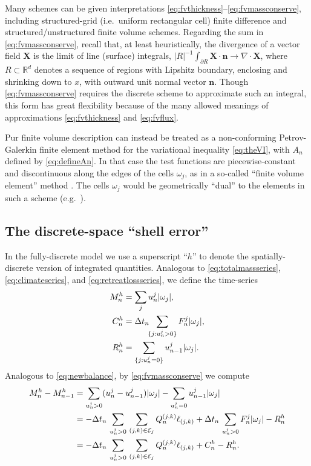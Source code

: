 \documentclass[final,onefignum]{siamart190516}
\newcommand\bn{\mathbf{n}}
\newcommand\bX{\mathbf{X}}
\newcommand{\Div}{\nabla\cdot}
\newcommand\RR{\mathbb{R}}
\begin{document}
Many schemes can be given interpretations \eqref{eq:fvthickness}--\eqref{eq:fvmassconserve}, including structured-grid (i.e.~uniform rectangular cell) finite difference \cite{Bueler2016,MortonMayers2005} and structured/unstructured finite volume \cite{LeVeque2002} schemes.  Regarding the sum in \eqref{eq:fvmassconserve}, recall that, at least heuristically, the divergence of a vector field $\bX$ is the limit of line (surface) integrals, $|R|^{-1} \int_{\partial R} \bX\cdot \bn \to \Div \bX$, where $R\subset \RR^d$ denotes a sequence of regions with Lipshitz boundary, enclosing and shrinking down to $x$, with outward unit normal vector $\bn$.  Though \eqref{eq:fvmassconserve} requires the discrete scheme to approximate such an integral, this form has great flexibility because of the many allowed meanings of approximations \eqref{eq:fvthickness} and \eqref{eq:fvflux}.

Pur finite volume description can instead be treated as a non-conforming Petrov-Galerkin finite element method for the variational inequality \eqref{eq:theVI}, with $A_n$ defined by \eqref{eq:defineAn}.  In that case the test functions are piecewise-constant and discontinuous along the edges of the cells $\omega_j$, as in a so-called ``finite volume element'' method \cite{Bueler2016,Cai1990,EwingLinLin2002}.  The cells $\omega_j$ would be geometrically ``dual'' to the elements in such a scheme (e.g.~\cite{Ringleretal2013}).

\subsection{The discrete-space ``shell error''}  \label{subsec:shellerror}  In the fully-discrete model we use a superscript ``$h$'' to denote the spatially-discrete version of integrated quantities.  Analogous to \eqref{eq:totalmassseries}, \eqref{eq:climateseries}, and \eqref{eq:retreatlossseries}, we define the time-series
\begin{align}
M_n^h &= \sum_j u_n^j |\omega_j|, \label{eq:fvtimeseriesdefn} \\
C_n^h &= \Delta t_n\!\!\sum_{\{j:u_n^j>0\}} F_n^j |\omega_j|,  \notag \\
R_n^h &= \sum_{\{j:u_n^j=0\}} u_{n-1}^j |\omega_j|.  \notag
\end{align}
Analogous to \eqref{eq:newbalance}, by \eqref{eq:fvmassconserve} we compute
\begin{align}
M_n^h - M_{n-1}^h &= \sum_{u_n^j>0} (u_n^j - u_{n-1}^j) |\omega_j| - \sum_{u_n^j=0} u_{n-1}^j |\omega_j| \notag \\
   &= - \Delta t_n\,\sum_{u_n^j>0}\, \sum_{(j,k)\in\mathcal{E}_j} Q_n^{(j,k)} \ell_{(j,k)} + \Delta t_n\,\sum_{u_n^j>0} F_n^j |\omega_j| - R_n^h \notag \\
   &= - \Delta t_n\,\sum_{u_n^j>0}\, \sum_{(j,k)\in\mathcal{E}_j} Q_n^{(j,k)} \ell_{(j,k)} + C_n^h - R_n^h.  \label{eq:fvnewbalance}
\end{align}
\end{document}
